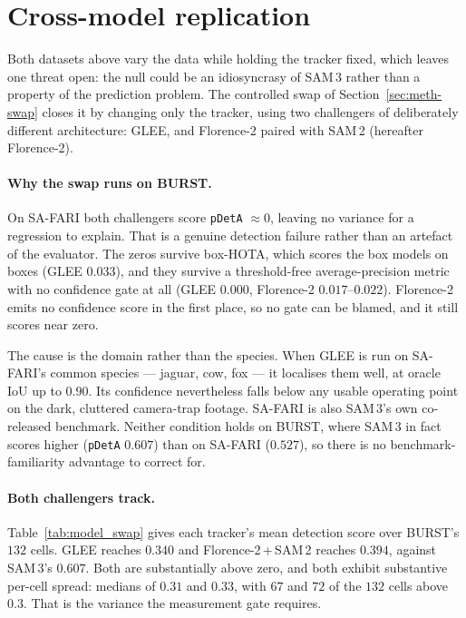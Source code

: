 \section{Cross-model replication}
\label{sec:model_swap}
Both datasets above vary the data while holding the tracker fixed, which leaves one threat open: the null
could be an idiosyncrasy of SAM\,3 rather than a property of the prediction problem. The controlled swap of
Section~\ref{sec:meth-swap} closes it by changing only the tracker, using two challengers of deliberately
different architecture: GLEE, and Florence-2 paired with SAM\,2 (hereafter Florence-2).

\paragraph{Why the swap runs on BURST.} On SA-FARI both challengers score \texttt{pDetA} $\approx 0$, leaving no
variance for a regression to explain. That is a genuine detection failure rather than an artefact of the
evaluator. The zeros survive box-HOTA, which scores the box models on boxes (GLEE $0.033$), and they survive a
threshold-free average-precision metric with no confidence gate at all (GLEE $0.000$, Florence-2
$0.017$--$0.022$). Florence-2 emits no confidence score in the first place, so no gate can be blamed, and it
still scores near zero.

The cause is the domain rather than the species. When GLEE is run on SA-FARI's common species --- jaguar,
cow, fox --- it localises them well, at oracle IoU up to $0.90$. Its confidence nevertheless falls below any
usable operating point on the dark, cluttered camera-trap footage. SA-FARI is also SAM\,3's own co-released
benchmark. Neither condition holds on BURST, where SAM\,3 in fact scores higher (\texttt{pDetA} $0.607$) than
on SA-FARI ($0.527$), so there is no benchmark-familiarity advantage to correct for.

\paragraph{Both challengers track.} Table~\ref{tab:model_swap} gives each tracker's mean detection score over
BURST's $132$ cells. GLEE reaches $0.340$ and Florence-2\,+\,SAM\,2 reaches $0.394$, against SAM\,3's $0.607$.
Both are substantially above zero, and both exhibit substantive per-cell spread: medians of $0.31$ and
$0.33$, with $67$ and $72$ of the $132$ cells above $0.3$. That is the variance the measurement gate requires.

